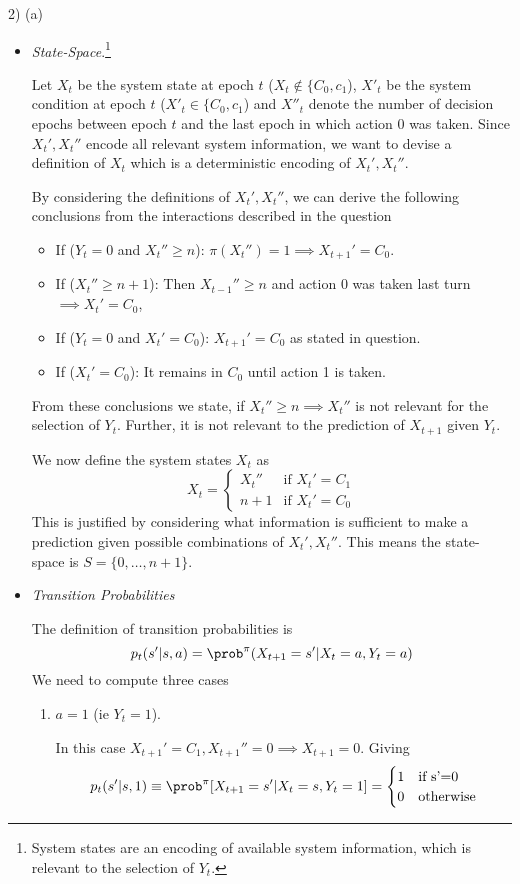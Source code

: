 \documentclass[11pt,a4paper]{article}
\begin{document}
\begin{answer}{2) (a)}
\begin{itemize}
    \item \textit{State-Space}.\footnote{System states are an encoding of available system information, which is relevant to the selection of $Y_t$.}
    \par Let $X_t$ be the system state at epoch $t$ ($X_t\not\in\{C_0,c_1$), $X'_t$ be the system condition at epoch $t$  ($X'_t\in\{C_0,c_1$) and $X''_t$ denote the number of decision epochs between epoch $t$ and the last epoch in which action 0 was taken. Since $X_t',X_t''$ encode all relevant system information, we want to devise a definition of $X_t$ which is a deterministic encoding of $X_t',X_t''$.
    \par By considering the definitions of $X_t',X_t''$, we can derive the following conclusions from the interactions described in the question
    \begin{itemize}
      \item If ($Y_t=0$ and $X_t''\geq n$): $\pi(X_t'')=1\implies X_{t+1}'=C_0$.
      \item If ($X_t''\geq n+1$): Then $X_{t-1}''\geq n$ and action 0 was taken last turn$\implies X_t'=C_0$,
      \item If ($Y_t=0$ and $X_t'=C_0$): $X_{t+1}'=C_0$ as stated in question.
      \item If ($X_t'=C_0$): It remains in $C_0$ until action 1 is taken.
    \end{itemize}
    From these conclusions we state, if $X_t''\geq n\implies X_t''$ is not relevant for the selection of $Y_t$. Further, it is not relevant to the prediction of $X_{t+1}$ given $Y_t$.
    \par We now define the system states $X_t$ as
    \[ X_t=\begin{cases}
      X_t''&\text{if }X_t'=C_1\\
      n+1&\text{if }X_t'=C_0
    \end{cases} \]
    This is justified by considering what information is sufficient to make a prediction given possible combinations of $X_t',X_t''$.
    This means the state-space is $S=\{0,\dots,n+1\}$.

    \item \textit{Transition Probabilities}
    \par The definition of transition probabilities is
    \[ p_t(s'|s,a)=\prob^\pi(X_{t+1}=s'|X_t=a,Y_t=a) \]
    We need to compute three cases
    \begin{enumerate}
      \item $a=1$ (ie $Y_t=1$).
      \par In this case $X_{t+1}'=C_1,X_{t+1}''=0\implies X_{t+1}=0$. Giving
      \[ p_t(s'|s,1)\equiv\prob^\pi[X_{t+1}=s'|X_t=s,Y_t=1]=\begin{cases}1&\text{if s'=0}\\0&\text{otherwise}\end{cases} \]


\end{enumerate}
\end{itemize}
\end{answer}
\end{document}
